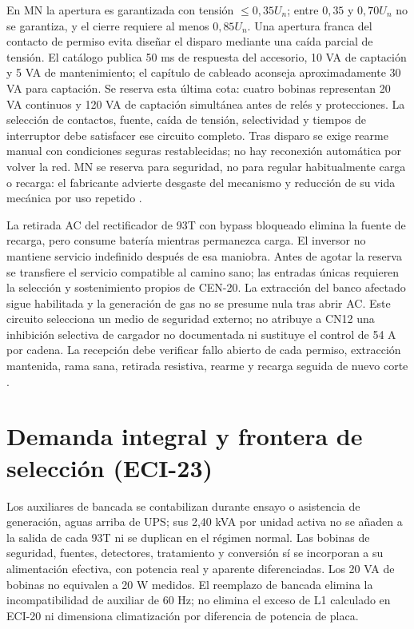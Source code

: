 En MN la apertura es garantizada con tensión $\leq0,35U_n$; entre $0,35$ y $0,70U_n$ no se garantiza, y el cierre requiere al menos $0,85U_n$. Una apertura franca del contacto de permiso evita diseñar el disparo mediante una caída parcial de tensión. El catálogo publica 50 ms de respuesta del accesorio, 10 VA de captación y 5 VA de mantenimiento; el capítulo de cableado aconseja aproximadamente 30 VA para captación. Se reserva esta última cota: cuatro bobinas representan 20 VA continuos y 120 VA de captación simultánea antes de relés y protecciones. La selección de contactos, fuente, caída de tensión, selectividad y tiempos de interruptor debe satisfacer ese circuito completo. Tras disparo se exige rearme manual con condiciones seguras restablecidas; no hay reconexión automática por volver la red. MN se reserva para seguridad, no para regular habitualmente carga o recarga: el fabricante advierte desgaste del mecanismo y reducción de su vida mecánica por uso repetido \parencite[pp.~C-37 y E-20]{lote23-nsx2026}.

La retirada AC del rectificador de 93T con bypass bloqueado elimina la fuente de recarga, pero consume batería mientras permanezca carga. El inversor no mantiene servicio indefinido después de esa maniobra. Antes de agotar la reserva se transfiere el servicio compatible al camino sano; las entradas únicas requieren la selección y sostenimiento propios de CEN-20. La extracción del banco afectado sigue habilitada y la generación de gas no se presume nula tras abrir AC. Este circuito selecciona un medio de seguridad externo; no atribuye a CN12 una inhibición selectiva de cargador no documentada ni sustituye el control de 54 A por cadena. La recepción debe verificar fallo abierto de cada permiso, extracción mantenida, rama sana, retirada resistiva, rearme y recarga seguida de nuevo corte \parencite{p7-eaton-93t-guia}.

\section{Demanda integral y frontera de selección (ECI-23)}
\label{sec:sd4-balance-eci23}

Los auxiliares de bancada se contabilizan durante ensayo o asistencia de generación, aguas arriba de UPS; sus 2,40 kVA por unidad activa no se añaden a la salida de cada 93T ni se duplican en el régimen normal. Las bobinas de seguridad, fuentes, detectores, tratamiento y conversión sí se incorporan a su alimentación efectiva, con potencia real y aparente diferenciadas. Los 20 VA de bobinas no equivalen a 20 W medidos. El reemplazo de bancada elimina la incompatibilidad de auxiliar de 60 Hz; no elimina el exceso de L1 calculado en ECI-20 ni dimensiona climatización por diferencia de potencia de placa.

